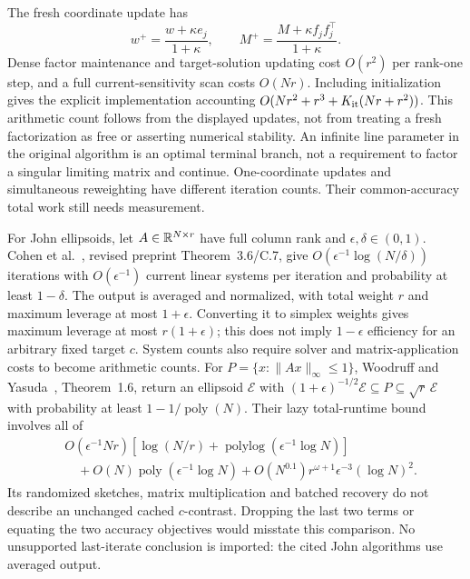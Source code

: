 \documentclass[11pt]{article}
\begin{document}
The fresh coordinate update has
\[
 w^+=\frac{w+\kappa e_j}{1+\kappa},\qquad
 M^+=\frac{M+\kappa f_jf_j^\top}{1+\kappa}.
\]
Dense factor maintenance and target-solution updating cost $O(r^2)$ per rank-one step, and a full current-sensitivity scan costs $O(Nr)$. Including initialization gives the explicit implementation accounting
$O(Nr^2+r^3+K_{\rm it}(Nr+r^2))$.
This arithmetic count follows from the displayed updates, not from treating a fresh factorization as free or asserting numerical stability. An infinite line parameter in the original algorithm is an optimal terminal branch, not a requirement to factor a singular limiting matrix and continue. One-coordinate updates and simultaneous reweighting have different iteration counts. Their common-accuracy total work still needs measurement.

For John ellipsoids, let $A\in\mathbb R^{N\times r}$ have full column rank and $\epsilon,\delta\in(0,1)$. Cohen et al.~\cite{cohen2019}, revised preprint Theorem~3.6/C.7, give $O(\epsilon^{-1}\log(N/\delta))$ iterations with $O(\epsilon^{-1})$ current linear systems per iteration and probability at least $1-\delta$. The output is averaged and normalized, with total weight $r$ and maximum leverage at most $1+\epsilon$. Converting it to simplex weights gives maximum leverage at most $r(1+\epsilon)$; this does not imply $1-\epsilon$ efficiency for an arbitrary fixed target $c$. System counts also require solver and matrix-application costs to become arithmetic counts. For $P=\{x:\|Ax\|_\infty\le1\}$, Woodruff and Yasuda~\cite{woodruff2024}, Theorem~1.6, return an ellipsoid $\mathcal E$ with $(1+\epsilon)^{-1/2}\mathcal E\subseteq P\subseteq\sqrt r\,\mathcal E$ with probability at least $1-1/\operatorname{poly}(N)$. Their lazy total-runtime bound involves all of
\[
\begin{split}
 &O(\epsilon^{-1}Nr)[\log(N/r)+\operatorname{polylog}(\epsilon^{-1}\log N)]\\
 &\quad+O(N)\operatorname{poly}(\epsilon^{-1}\log N)
 +O(N^{0.1})r^{\omega+1}\epsilon^{-3}(\log N)^2.
\end{split}
\]
Its randomized sketches, matrix multiplication and batched recovery do not describe an unchanged cached $c$-contrast. Dropping the last two terms or equating the two accuracy objectives would misstate this comparison. No unsupported last-iterate conclusion is imported: the cited John algorithms use averaged output.
\end{document}
